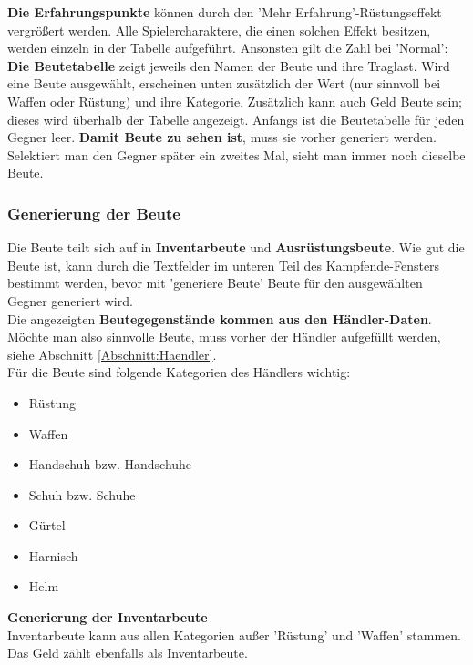 \documentclass[11pt, a4paper, german]{article}
\begin{document}
\textbf{Die Erfahrungspunkte} können durch den 'Mehr Erfahrung'-Rüstungseffekt vergrößert werden. Alle Spielercharaktere, die einen solchen Effekt besitzen, werden einzeln in der Tabelle aufgeführt. Ansonsten gilt die Zahl bei 'Normal':\\

\textbf{Die Beutetabelle} zeigt jeweils den Namen der Beute und ihre Traglast. Wird eine Beute ausgewählt, erscheinen unten zusätzlich der Wert (nur sinnvoll bei Waffen oder Rüstung) und ihre Kategorie. Zusätzlich kann auch Geld Beute sein; dieses wird überhalb der Tabelle angezeigt. Anfangs ist die Beutetabelle für jeden Gegner leer. \textbf{Damit Beute zu sehen ist}, muss sie vorher generiert werden. Selektiert man den Gegner später ein zweites Mal, sieht man immer noch dieselbe Beute.

\subsubsection{Generierung der Beute}\label{Abschnitt:Beute}
Die Beute teilt sich auf in \textbf{Inventarbeute} und \textbf{Ausrüstungsbeute}. Wie gut die Beute ist, kann durch die Textfelder im unteren Teil des Kampfende-Fensters bestimmt werden, bevor mit 'generiere Beute' Beute für den ausgewählten Gegner generiert wird.\\

Die angezeigten \textbf{Beutegegenstände kommen aus den Händler-Daten}. Möchte man also sinnvolle Beute, muss vorher der Händler aufgefüllt werden, siehe Abschnitt \ref{Abschnitt:Haendler}.\\

Für die Beute sind folgende Kategorien des Händlers wichtig: \begin{itemize}
\item Rüstung
\item Waffen
\item Handschuh bzw. Handschuhe
\item Schuh bzw. Schuhe
\item Gürtel
\item Harnisch
\item Helm
\end{itemize}

\textbf{Generierung der Inventarbeute}\\

Inventarbeute kann aus allen Kategorien außer 'Rüstung' und 'Waffen' stammen. Das Geld zählt ebenfalls als Inventarbeute.\\
\end{document}

